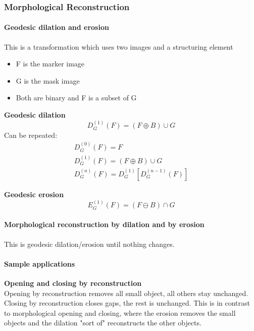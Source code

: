 \subsubsection{Morphological Reconstruction}
\paragraph{Geodesic dilation and erosion}
This is a transformation which uses two images and a structuring element
\begin{itemize}
\item F is the marker image
\item G is the mask image
\item Both are binary and F is a subset of G
\end{itemize}
\textbf{Geodesic dilation}
\[
	D_G^{(1)}(F) = (F\oplus B)\cup G
\]
Can be repeated:
\begin{align*}
	D_G^{(0)}(F) = F \\
	D_G^{(1)}(F) = (F\oplus B)\cup G\\
	D_G^{(n)}(F) = D_G^{(1)}[D_G^{(n-1)}(F)]
\end{align*}

\textbf{Geodesic erosion}
\[
	E_G^{(1)}(F) = (F\ominus B)\cap G
\]

\paragraph{Morphological reconstruction by dilation and by erosion}
This is geodesic dilation/erosion until nothing changes.

\paragraph{Sample applications}
\textbf{Opening and closing by reconstruction}\\
Opening by reconstruction removes all small object, all others stay unchanged.
Closing by reconstruction closes gaps, the rest is unchanged. This is in contrast to morphological opening and closing, where the erosion removes the small objects and the dilation "sort of" reconstructs the other objects.\\

